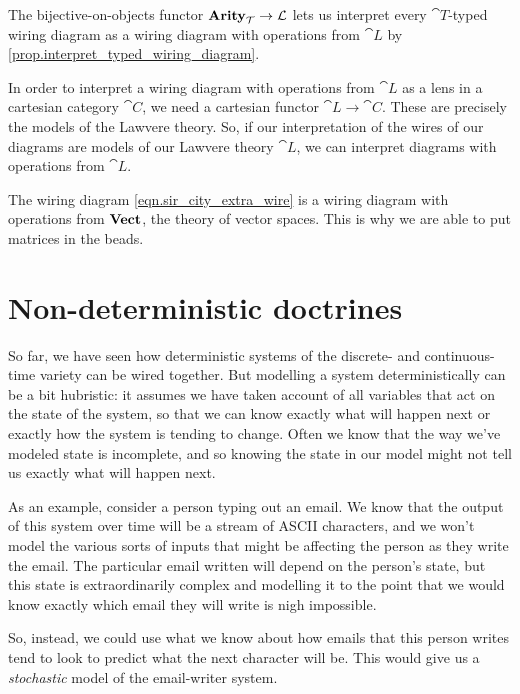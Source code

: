 \documentclass[DynamicalBook]{subfiles}
\begin{document}
\begin{remark}
The bijective-on-objects functor $\textbf{Arity}_{\mathcal{T}} \to \mathcal{L}$ lets
us interpret every $\cat{T}$-typed wiring diagram as a wiring diagram with
operations from $\cat{L}$ by \cref{prop.interpret_typed_wiring_diagram}.
\end{remark}

In order to interpret a wiring diagram with operations from $\cat{L}$ as a lens
in a cartesian category $\cat{C}$, we need a cartesian functor $\cat{L} \to
\cat{C}$. These are precisely the models of the Lawvere theory. So, if our
interpretation of the wires
of our diagrams are models of our Lawvere theory $\cat{L}$, we can interpret
diagrams with operations from $\cat{L}$.


\begin{example}
  The wiring diagram \cref{eqn.sir_city_extra_wire} is a wiring diagram with
  operations from $\textbf{Vect}$, the theory of vector spaces. This is why we are
  able to put matrices in the beads.
\end{example}


\chapter{Non-deterministic doctrines}\label{sec.non_deterministic_systems}

So far, we have seen how deterministic systems of the discrete- and
continuous-time variety can be wired together. But modelling a system
deterministically can be a bit hubristic: it assumes we have taken account of
all variables that act on the state of the system, so that we can know exactly
what will happen next or exactly how the system is tending to change. Often we
know that the way we've modeled state is incomplete, and so knowing the state in
our model might not tell us exactly what will happen next.

As an example, consider a person typing out an email. We know that the output of
this system over time will be a stream of ASCII characters, and we won't model the various sorts
of inputs that might be affecting the person as they write the email. The
particular email written will depend on the person's state, but this state is
extraordinarily complex and modelling it to the point that we would know exactly
which email they will write is nigh impossible. 

So, instead, we could use what
we know about how emails that this person writes tend to look to predict what
the next character will be. This would give us a \emph{stochastic} model of the
email-writer system.
\end{document}
